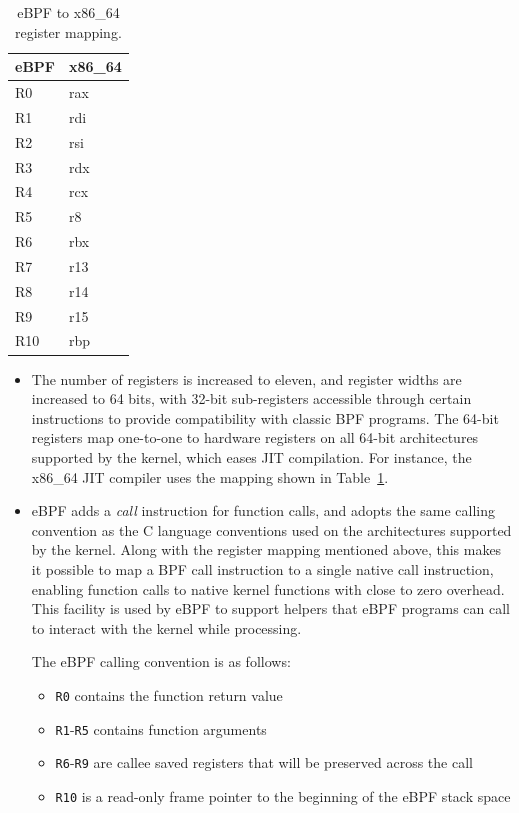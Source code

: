 \documentclass[10pt]{sig-alternate-05-2015}
\begin{document}
\begin{table}[htbp]
\caption{\label{tbl:reg-map}
eBPF to x86\_64 register mapping.}
\centering
\begin{tabular}{ll}
\toprule
eBPF & x86\_64\\
\midrule
R0 & rax\\
R1 & rdi\\
R2 & rsi\\
R3 & rdx\\
R4 & rcx\\
R5 & r8\\
R6 & rbx\\
R7 & r13\\
R8 & r14\\
R9 & r15\\
R10 & rbp\\
\bottomrule
\end{tabular}
\end{table}


\begin{itemize}
\item The number of registers is increased to eleven, and register widths are
increased to 64 bits, with 32-bit sub-registers accessible through certain
instructions to provide compatibility with classic BPF programs. The 64-bit
registers map one-to-one to hardware registers on all 64-bit architectures
supported by the kernel, which eases JIT compilation. For instance, the x86\_64
JIT compiler uses the mapping shown in Table \ref{tbl:reg-map}.

\item eBPF adds a \emph{call} instruction for function calls, and adopts the same calling
convention as the C language conventions used on the architectures supported
by the kernel. Along with the register mapping mentioned above, this makes it
possible to map a BPF call instruction to a single native call instruction,
enabling function calls to native kernel functions with close to zero
overhead. This facility is used by eBPF to support helpers that eBPF programs
can call to interact with the kernel while processing.

The eBPF calling convention is as follows:
\begin{itemize}
\item \texttt{R0} contains the function return value
\item \texttt{R1}-\texttt{R5} contains function arguments
\item \texttt{R6}-\texttt{R9} are callee saved registers that will be preserved across the call
\item \texttt{R10} is a read-only frame pointer to the beginning of the eBPF stack space
\end{itemize}
\end{itemize}
\end{document}
